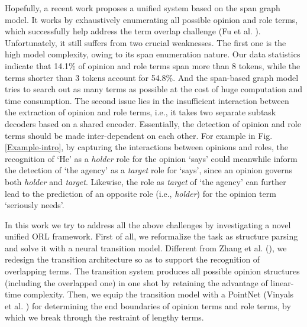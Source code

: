 \documentclass[letterpaper]{article} \usepackage{aaai22}  \usepackage{times}  \usepackage{helvet}  \usepackage{courier}  \usepackage[hyphens]{url}  \usepackage{graphicx} \urlstyle{rm} \def\UrlFont{\rm}  \usepackage{natbib}  \usepackage{caption} \DeclareCaptionStyle{ruled}{labelfont=normalfont,labelsep=colon,strut=off} \frenchspacing  \setlength{\pdfpagewidth}{8.5in}  \setlength{\pdfpageheight}{11in}  \usepackage{algorithm}
\begin{document}
Hopefully, a recent work \cite{xia-etal-2021-unified} proposes a unified system based on the span graph model.
It works by exhaustively enumerating all possible opinion and role terms, which successfully help address the term overlap challenge (Fu et al. \citeyear{fu-etal-2021-spanner}).
Unfortunately, it still suffers from two crucial weaknesses.
The first one is the high model complexity, owing to its span enumeration nature.
Our data statistics indicate that 14.1\% of opinion and role terms span more than 8 tokens, while the terms shorter than 3 tokens account for 54.8\%.
And the span-based graph model tries to search out as many terms as possible at the cost of huge computation and time consumption.
The second issue lies in the insufficient interaction between the extraction of opinion and role terms, i.e., it takes two separate subtask decoders based on a shared encoder.
Essentially, the detection of opinion and role terms should be made inter-dependent on each other.
For example in Fig. \ref{Example-intro}, by capturing the interactions between opinions and roles, the recognition of `He' as a \emph{holder} role for the opinion `says' could meanwhile inform the detection of `the agency' as a \emph{target} role for `says', since an opinion governs both \emph{holder} and \emph{target}.
Likewise, the role as \emph{target} of `the agency' can further lead to the prediction of an opposite role (i.e., \emph{holder}) for the opinion term `seriously needs'.











In this work we try to address all the above challenges by investigating a novel unified ORL framework.
First of all, we reformalize the task as structure parsing and solve it with a neural transition model.
Different from Zhang et al. (\citeyear{ZhangWF19}), we redesign the transition architecture so as to support the recognition of overlapping terms.
The transition system produces all possible opinion structures (including the overlapped one) in one shot by retaining the advantage of linear-time complexity.
Then, we equip the transition model with a PointNet (Vinyals et al. \citeyear{VinyalsFJ15}) for determining the end boundaries of opinion terms and role terms, by which we break through the restraint of lengthy terms.
\end{document}
